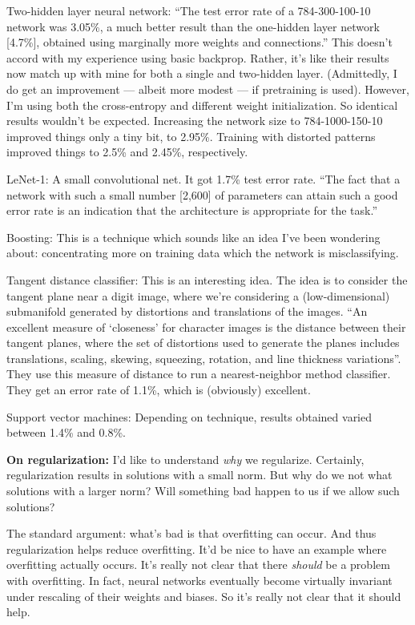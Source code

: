\documentclass[12pt]{article}
\begin{document}
Two-hidden layer neural network: ``The test error rate of a
784-300-100-10 network was 3.05\%, a much better result than the
one-hidden layer network [4.7\%], obtained using marginally more
weights and connections.''  This doesn't accord with my experience
using basic backprop.  Rather, it's like their results now match up
with mine for both a single and two-hidden layer.  (Admittedly, I do
get an improvement --- albeit more modest --- if pretraining is used).
However, I'm using both the cross-entropy and different weight
initialization.  So identical results wouldn't be expected.
Increasing the network size to 784-1000-150-10 improved things only a
tiny bit, to 2.95\%.  Training with distorted patterns improved things
to 2.5\% and 2.45\%, respectively.  

LeNet-1: A small convolutional net.  It got 1.7\% test error rate.
``The fact that a network with such a small number [2,600] of
parameters can attain such a good error rate is an indication that the
architecture is appropriate for the task.''

Boosting: This is a technique which sounds like an idea I've been
wondering about: concentrating more on training data which the network
is misclassifying.

Tangent distance classifier: This is an interesting idea.  The idea is
to consider the tangent plane near a digit image, where we're
considering a (low-dimensional) submanifold generated by distortions
and translations of the images.  ``An excellent measure of `closeness'
for character images is the distance between their tangent planes,
where the set of distortions used to generate the planes includes
translations, scaling, skewing, squeezing, rotation, and line
thickness variations''.  They use this measure of distance to run a
nearest-neighbor method classifier.  They get an error rate of 1.1\%,
which is (obviously) excellent.

Support vector machines: Depending on technique, results obtained
varied between 1.4\% and 0.8\%.

\textbf{On regularization:} I'd like to understand \emph{why} we
regularize.  Certainly, regularization results in solutions with a
small norm.  But why do we not what solutions with a larger norm?
Will something bad happen to us if we allow such solutions?

The standard argument: what's bad is that overfitting can occur.  And
thus regularization helps reduce overfitting.  It'd be nice to have an
example where overfitting actually occurs.  It's really not clear that
there \emph{should} be a problem with overfitting.  In fact, neural
networks eventually become virtually invariant under rescaling of
their weights and biases.  So it's really not clear that it should
help.
\end{document}
